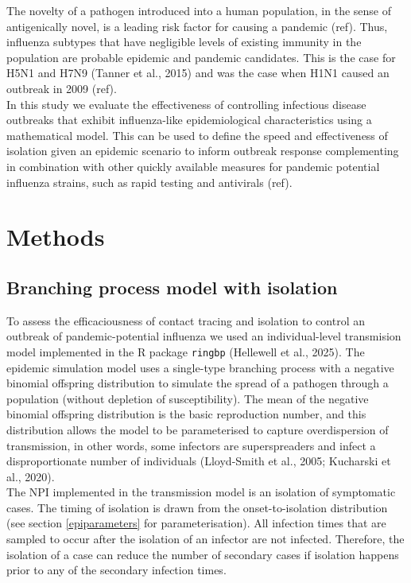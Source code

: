 \documentclass{article}
\begin{document}
The novelty of a pathogen introduced into a human population, in the sense of antigenically novel, is a leading risk factor for causing a pandemic (ref). Thus, influenza subtypes that have negligible levels of existing immunity in the population are probable epidemic and pandemic candidates. This is the case for H5N1 and H7N9 (Tanner et al., 2015) and was the case when H1N1 caused an outbreak in 2009 (ref). \\

In this study we evaluate the effectiveness of controlling infectious disease outbreaks that exhibit influenza-like epidemiological characteristics using a mathematical model. This can be used to define the speed and effectiveness of isolation given an epidemic scenario to inform outbreak response complementing in combination with other quickly available measures for pandemic potential influenza strains, such as rapid testing and antivirals (ref).

\section{Methods}

\subsection{Branching process model with isolation}

To assess the efficaciousness of contact tracing and isolation to control an outbreak of pandemic-potential influenza we used an individual-level transmision model implemented in the R package \texttt{ringbp} (Hellewell et al., 2025). The epidemic simulation model uses a single-type branching process with a negative binomial offspring distribution to simulate the spread of a pathogen through a population (without depletion of susceptibility). The mean of the negative binomial offspring distribution is the basic reproduction number, and this distribution allows the model to be parameterised to capture overdispersion of transmission, in other words, some infectors are superspreaders and infect a disproportionate number of individuals (Lloyd-Smith et al., 2005; Kucharski et al., 2020). \\

The NPI implemented in the transmission model is an isolation of symptomatic cases. The timing of isolation is drawn from the onset-to-isolation distribution (see section \ref{epiparameters} for parameterisation). All infection times that are sampled to occur after the isolation of an infector are not infected. Therefore, the isolation of a case can reduce the number of secondary cases if isolation happens prior to any of the secondary infection times. \\
\end{document}

